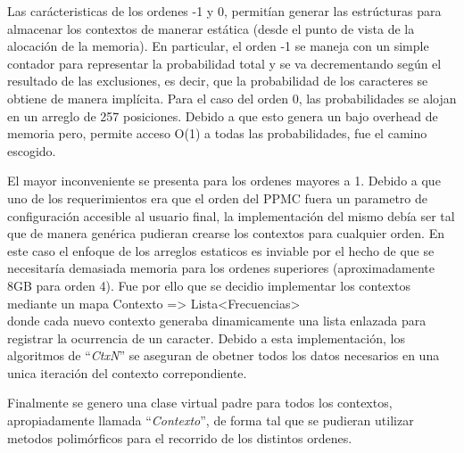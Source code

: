 \documentclass{article}
\begin{document}
	Las carácteristicas de los ordenes -1 y 0, permitían generar las estrúcturas para almacenar los contextos de manerar estática (desde el punto de vista de la alocación de la memoria). En particular, el orden -1 se maneja con un simple contador para representar la probabilidad total y se va decrementando según el resultado de las exclusiones, es decir, que la probabilidad de los caracteres se obtiene de manera implícita. Para el caso del orden 0, las probabilidades se alojan en un arreglo de 257 posiciones. Debido a que esto genera un bajo overhead de memoria pero, permite acceso O(1) a todas las probabilidades, fue el camino escogido.
	\medskip

	El mayor inconveniente se presenta para los ordenes mayores a 1. Debido a que uno de los requerimientos era que el orden del PPMC fuera un parametro de configuración accesible al usuario final, la implementación del mismo debía ser tal que de manera genérica pudieran crearse los contextos para cualquier orden. En este caso el enfoque de los arreglos estaticos es inviable por el hecho de que se necesitaría demasiada memoria para los ordenes superiores (aproximadamente 8GB para orden 4).
	Fue por ello que se decidio implementar los contextos mediante un mapa {\ttfamily\footnotesize Contexto => Lista<Frecuencias> \\} donde cada nuevo contexto generaba dinamicamente una lista enlazada para registrar la ocurrencia de un caracter. Debido a esta implementación, los algoritmos de ``\textit{CtxN}'' se aseguran de obetner todos los datos necesarios en una unica iteración del contexto correpondiente.
	\medskip

	Finalmente se genero una clase virtual padre para todos los contextos, apropiadamente llamada ``\textit{Contexto}'', de forma tal que se pudieran utilizar metodos polimórficos para el recorrido de los distintos ordenes.
	\medskip

\bigskip
\end{document}
